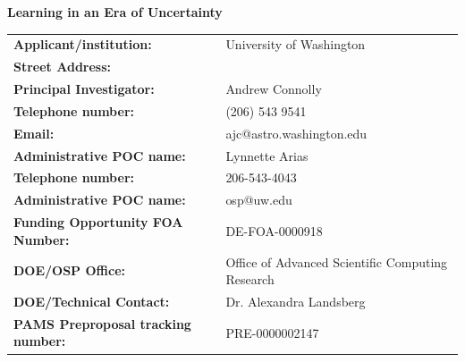 \documentclass[useAMS,usenatbib,tightenlines,11pt,preprint]{aastex}
\begin{document}
 

\begin{center}
{\bf \Large Learning in an Era of Uncertainty}
\end{center}

\vspace{1cm}

\noindent
\begin{tabular}{ll}
{\bf Applicant/institution: } & University of Washington\\
{\bf Street Address: } & \\
{\bf Principal Investigator: } &Andrew Connolly \\
{\bf Telephone number: } & (206) 543 9541 \\
{\bf Email: } & ajc@astro.washington.edu \\
{\bf Administrative POC name:} & Lynnette Arias\\
{\bf Telephone number:} & 206-543-4043\\
{\bf Administrative POC name:} & osp@uw.edu\\
{\bf Funding Opportunity FOA Number:} & DE-FOA-0000918 \\
{\bf DOE/OSP Office: } & Office of Advanced Scientific Computing Research \\
{\bf DOE/Technical Contact: } & Dr. Alexandra Landsberg \\
{\bf PAMS Preproposal tracking number: } & PRE-0000002147 \\
\end{tabular}

\end{document}
